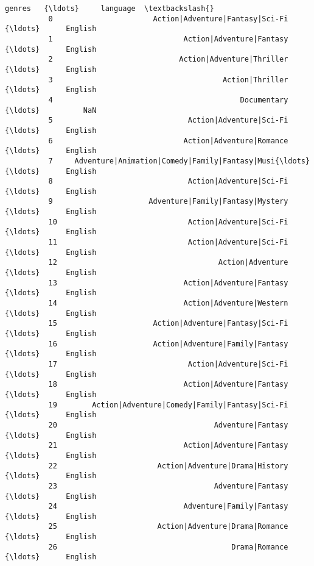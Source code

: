 \documentclass[11pt]{article}
\begin{document}
\begin{Verbatim}[commandchars=\\\{\}]
                                                           genres   {\ldots}     language  \textbackslash{}
          0                       Action|Adventure|Fantasy|Sci-Fi   {\ldots}      English   
          1                              Action|Adventure|Fantasy   {\ldots}      English   
          2                             Action|Adventure|Thriller   {\ldots}      English   
          3                                       Action|Thriller   {\ldots}      English   
          4                                           Documentary   {\ldots}          NaN   
          5                               Action|Adventure|Sci-Fi   {\ldots}      English   
          6                              Action|Adventure|Romance   {\ldots}      English   
          7     Adventure|Animation|Comedy|Family|Fantasy|Musi{\ldots}   {\ldots}      English   
          8                               Action|Adventure|Sci-Fi   {\ldots}      English   
          9                      Adventure|Family|Fantasy|Mystery   {\ldots}      English   
          10                              Action|Adventure|Sci-Fi   {\ldots}      English   
          11                              Action|Adventure|Sci-Fi   {\ldots}      English   
          12                                     Action|Adventure   {\ldots}      English   
          13                             Action|Adventure|Fantasy   {\ldots}      English   
          14                             Action|Adventure|Western   {\ldots}      English   
          15                      Action|Adventure|Fantasy|Sci-Fi   {\ldots}      English   
          16                      Action|Adventure|Family|Fantasy   {\ldots}      English   
          17                              Action|Adventure|Sci-Fi   {\ldots}      English   
          18                             Action|Adventure|Fantasy   {\ldots}      English   
          19        Action|Adventure|Comedy|Family|Fantasy|Sci-Fi   {\ldots}      English   
          20                                    Adventure|Fantasy   {\ldots}      English   
          21                             Action|Adventure|Fantasy   {\ldots}      English   
          22                       Action|Adventure|Drama|History   {\ldots}      English   
          23                                    Adventure|Fantasy   {\ldots}      English   
          24                             Adventure|Family|Fantasy   {\ldots}      English   
          25                       Action|Adventure|Drama|Romance   {\ldots}      English   
          26                                        Drama|Romance   {\ldots}      English   

\end{Verbatim}
\end{document}
